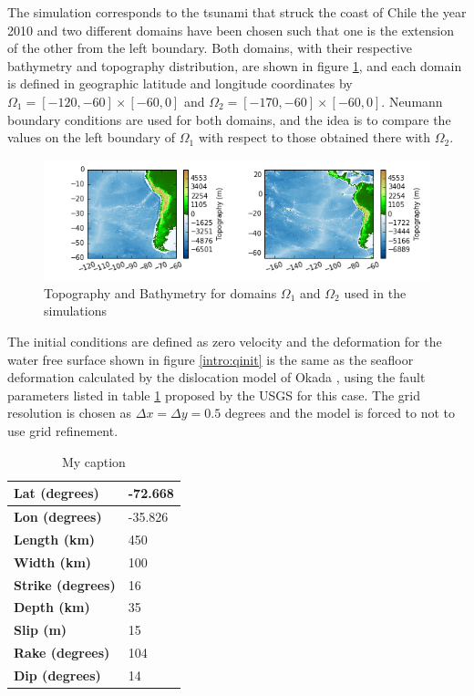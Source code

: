 The simulation corresponds to the tsunami that struck the coast of Chile the year 2010 and two different domains have been chosen such that one is the extension of the other from the left boundary. Both domains, with their respective bathymetry and topography distribution, are shown in figure \ref{intro:topobati}, and each domain is defined in geographic latitude and longitude coordinates by $\Omega_1 = [-120,-60]\times[-60,0]$ and $\Omega_2 = [-170,-60]\times [-60,0]$. Neumann boundary conditions are used for both domains, and the idea is to compare the values on the left boundary of $\Omega_1$ with respect to those obtained there with $\Omega_2$.

\begin{figure}
	\center
	\includegraphics[width=\textwidth]{figures/GeoclawChile2010_domains_topo.png}
	\caption{Topography and Bathymetry for domains $\Omega_1$ and $\Omega_2$ used in the simulations}
	\label{intro:topobati}
\end{figure}

The initial conditions are defined as zero velocity and the deformation for the water free surface shown in figure \ref{intro:qinit} is the same as the seafloor deformation calculated by the dislocation model of Okada \cite{okada1985surface}, using the fault parameters listed in table \ref{intro:faulttable} proposed by the USGS for this case. The grid resolution is chosen as $\Delta x = \Delta y = 0.5$ degrees and the model is forced to not to use grid refinement. 

\begin{table}[]
\centering
\caption{My caption}
\label{my-label}
\begin{tabular}{|l|l|}
\hline
\textbf{Lat (degrees)}    & -72.668 \\ \hline
\textbf{Lon (degrees)}    & -35.826 \\ \hline
\textbf{Length (km)}      & 450     \\ \hline
\textbf{Width (km)}       & 100     \\ \hline
\textbf{Strike (degrees)} & 16      \\ \hline
\textbf{Depth (km)}       & 35      \\ \hline
\textbf{Slip (m)}         & 15      \\ \hline
\textbf{Rake (degrees)}   & 104     \\ \hline
\textbf{Dip (degrees)}    & 14      \\ \hline
\end{tabular}
\label{intro:faulttable}
\end{table}

